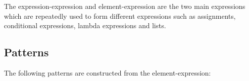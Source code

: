 The expression-expression and element-expression are the two main expressions which are repeatedly used to form different expressions such as assignments, conditional expressions, lambda expressions and lists.

\subsection{Patterns}
The following patterns are constructed from the element-expression:

\begin{ebnf}
\end{ebnf}


